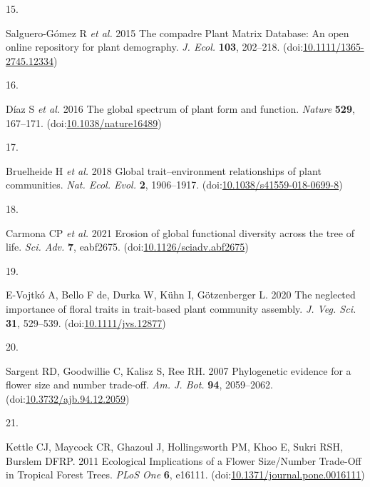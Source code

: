 \documentclass[
  12pt,
  a4paper,
]{article}
\newlength{\cslhangindent}
\newlength{\csllabelwidth}
\newlength{\cslentryspacingunit} %
\newenvironment{CSLReferences}[2] %
 {%
  \setlength{\parindent}{0pt}
  \ifodd #1
  \let\oldpar\par
  \def\par{\hangindent=\cslhangindent\oldpar}
  \fi
  \setlength{\parskip}{#2\cslentryspacingunit}
 }%
 {}
\newcommand{\CSLLeftMargin}[1]{\parbox[t]{\csllabelwidth}{#1}}
\newcommand{\CSLRightInline}[1]{\parbox[t]{\linewidth - \csllabelwidth}{#1}\break}
\begin{document}
\begin{CSLReferences}{0}{0}
\leavevmode{}%
\CSLLeftMargin{15. }
\CSLRightInline{Salguero-Gómez R \emph{et al.} 2015 The compadre {Plant Matrix Database}: An open online repository for plant demography. \emph{J. Ecol.} \textbf{103}, 202--218. (doi:\href{https://doi.org/10.1111/1365-2745.12334}{10.1111/1365-2745.12334})}

\leavevmode{}%
\CSLLeftMargin{16. }
\CSLRightInline{Díaz S \emph{et al.} 2016 The global spectrum of plant form and function. \emph{Nature} \textbf{529}, 167--171. (doi:\href{https://doi.org/10.1038/nature16489}{10.1038/nature16489})}

\leavevmode{}%
\CSLLeftMargin{17. }
\CSLRightInline{Bruelheide H \emph{et al.} 2018 Global trait--environment relationships of plant communities. \emph{Nat. Ecol. Evol.} \textbf{2}, 1906--1917. (doi:\href{https://doi.org/10.1038/s41559-018-0699-8}{10.1038/s41559-018-0699-8})}

\leavevmode{}%
\CSLLeftMargin{18. }
\CSLRightInline{Carmona CP \emph{et al.} 2021 Erosion of global functional diversity across the tree of life. \emph{Sci. Adv.} \textbf{7}, eabf2675. (doi:\href{https://doi.org/10.1126/sciadv.abf2675}{10.1126/sciadv.abf2675})}

\leavevmode{}%
\CSLLeftMargin{19. }
\CSLRightInline{E-Vojtkó A, Bello F de, Durka W, Kühn I, Götzenberger L. 2020 The neglected importance of floral traits in trait-based plant community assembly. \emph{J. Veg. Sci.} \textbf{31}, 529--539. (doi:\href{https://doi.org/10.1111/jvs.12877}{10.1111/jvs.12877})}

\leavevmode{}%
\CSLLeftMargin{20. }
\CSLRightInline{Sargent RD, Goodwillie C, Kalisz S, Ree RH. 2007 Phylogenetic evidence for a flower size and number trade-off. \emph{Am. J. Bot.} \textbf{94}, 2059--2062. (doi:\href{https://doi.org/10.3732/ajb.94.12.2059}{10.3732/ajb.94.12.2059})}

\leavevmode{}%
\CSLLeftMargin{21. }
\CSLRightInline{Kettle CJ, Maycock CR, Ghazoul J, Hollingsworth PM, Khoo E, Sukri RSH, Burslem DFRP. 2011 Ecological {Implications} of a {Flower Size}/{Number Trade}-{Off} in {Tropical Forest Trees}. \emph{PLoS One} \textbf{6}, e16111. (doi:\href{https://doi.org/10.1371/journal.pone.0016111}{10.1371/journal.pone.0016111})}


\end{CSLReferences}
\end{document}
